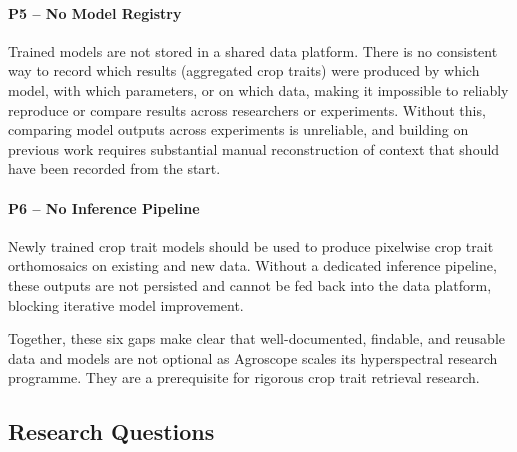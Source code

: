 \paragraph{P5 -- No Model Registry} Trained models are not stored in a shared data platform. There is no consistent way to record which results (aggregated crop traits) were produced by which model, with which parameters, or on which data, making it impossible to reliably reproduce or compare results across researchers or experiments. Without this, comparing model outputs across experiments is unreliable, and building on previous work requires substantial manual reconstruction of context that should have been recorded from the start.
\paragraph{P6 -- No Inference Pipeline } Newly trained crop trait models should be used to produce pixelwise crop trait orthomosaics on existing and new data. Without a dedicated inference pipeline, these outputs are not persisted and cannot be fed back into the data platform, blocking iterative model improvement. 

Together, these six gaps make clear that well-documented, findable, and reusable data and models are not optional as Agroscope scales its hyperspectral research programme. They are a prerequisite for rigorous crop trait retrieval research.

\clearpage

\subsection{Research Questions}

